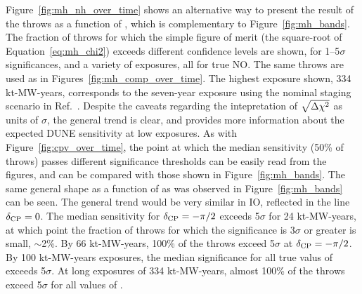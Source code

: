 Figure~\ref{fig:mh_nh_over_time} shows an alternative way to present the result of the throws as a function of \deltacp, which is complementary to Figure~\ref{fig:mh_bands}. The fraction of throws for which the simple figure of merit (the square-root of Equation~\ref{eq:mh_chi2}) exceeds different confidence levels are shown, for 1--5$\sigma$ significances, and a variety of exposures, all for true NO. The same throws are used as in Figures~\ref{fig:mh_comp_over_time}. The highest exposure shown, 334 kt-MW-years, corresponds to the seven-year exposure using the nominal staging scenario in Ref.~\cite{Abi:2020qib}. Despite the caveats regarding the intepretation of $\sqrt{\Delta\chi^{2}}$ as units of $\sigma$, the general trend is clear, and provides more information about the expected DUNE sensitivity at low exposures. As with Figure~\ref{fig:cpv_over_time}, the point at which the median sensitivity (50\% of throws) passes different significance thresholds can be easily read from the figures, and can be compared with those shown in Figure~\ref{fig:mh_bands}. The same general shape as a function of \deltacp as was observed in Figure~\ref{fig:mh_bands} can be seen. The general trend would be very similar in IO, reflected in the line $\delta_{\rm CP} = 0$. The median sensitivity for $\delta_{\rm CP} = -\pi/2$ exceeds 5$\sigma$ for 24 kt-MW-years, at which point the fraction of throws for which the significance is 3$\sigma$ or greater is small, $\sim$2\%. By 66 kt-MW-years, 100\% of the throws exceed 5$\sigma$ at $\delta_{\rm CP} = -\pi/2$. By 100 kt-MW-years exposures, the median significance for all true valus of \deltacp exceeds 5$\sigma$. At long exposures of 334 kt-MW-years, almost 100\% of the throws exceed 5$\sigma$ for all values of \deltacp.
